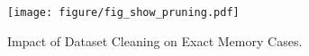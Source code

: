 \begin{figure}[!tbp]
    \centering     
    \texttt{[image: figure/fig\_show\_pruning.pdf]}
    \caption{Impact of Dataset Cleaning on Exact Memory Cases.}
    \label{fig:show_pruning_mean}
\end{figure}
